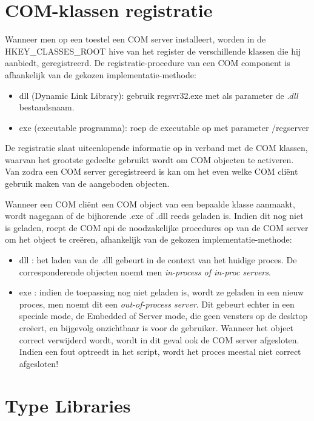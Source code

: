 \documentclass[11pt,a4paper]{report}
\begin{document}
\section{COM-klassen registratie}
Wanneer men op een toestel een COM server installeert, worden in de HKEY\_CLASSES\_ROOT  hive van het register de verschillende klassen die hij aanbiedt, geregistreerd. De registratie-procedure van een COM component is afhankelijk van de gekozen implementatie-methode:
\begin{itemize}
\item{dll} (Dynamic Link Library): gebruik regsvr32.exe met als parameter de $.dll$ bestandsnaam.
\item {exe} (executable programma): roep de executable op met parameter /regserver
\end{itemize}
\par De registratie slaat uiteenlopende informatie op in verband met de COM klassen, waarvan het grootste gedeelte gebruikt wordt om COM objecten te activeren. Van zodra een COM server geregistreerd is kan om het even welke COM cliënt gebruik maken van de aangeboden objecten.
\par Wanneer een COM cliënt een COM object van een bepaalde klasse aanmaakt, wordt nagegaan of de bijhorende .exe of .dll reeds geladen is. Indien dit nog niet is geladen, roept de COM api de noodzakelijke procedures op van de COM server om het object te creëren, afhankelijk van de gekozen implementatie-methode:
\begin{itemize}
\item{dll} : het laden van de .dll gebeurt in de context van het huidige proces. De corresponderende objecten noemt men \textit{in-process of in-proc servers}.
\item{exe} : indien de toepassing nog niet geladen is, wordt ze geladen in een nieuw proces, men noemt dit een \textit{out-of-process server}. Dit gebeurt echter in een speciale mode, de Embedded of Server mode, die geen vensters op de desktop creëert, en bijgevolg onzichtbaar is voor de gebruiker. Wanneer het object correct verwijderd wordt, wordt in dit geval ook de COM server afgesloten. Indien een fout optreedt in het script, wordt het proces meestal niet correct afgesloten!
\end{itemize}

\section{Type Libraries}
\end{document}
